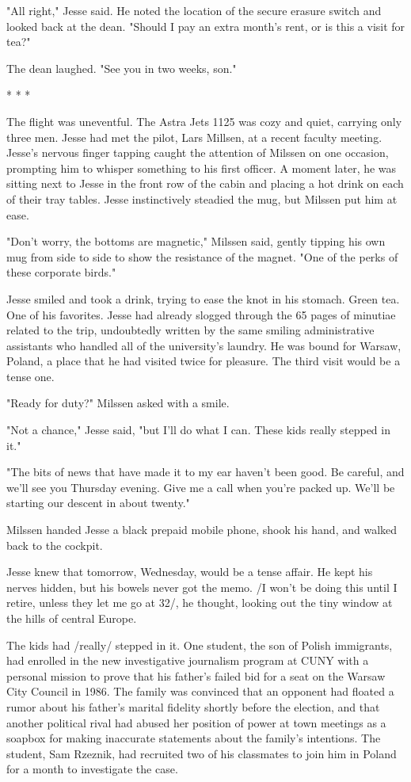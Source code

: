 "All right," Jesse said.  He noted the location of the secure erasure switch and looked back at the dean.  "Should I pay an extra month's rent, or is this a visit for tea?"

The dean laughed.  "See you in two weeks, son."

					* * *

The flight was uneventful.  The Astra Jets 1125 was cozy and quiet, carrying only three men.  Jesse had met the pilot, Lars Millsen, at a recent faculty meeting.  Jesse's nervous finger tapping caught the attention of Milssen on one occasion, prompting him to whisper something to his first officer.  A moment later, he was sitting next to Jesse in the front row of the cabin and placing a hot drink on each of their tray tables.  Jesse instinctively steadied the mug, but Milssen put him at ease.

"Don't worry, the bottoms are magnetic," Milssen said, gently tipping his own mug from side to side to show the resistance of the magnet.  "One of the perks of these corporate birds."

Jesse smiled and took a drink, trying to ease the knot in his stomach.  Green tea.  One of his favorites.  Jesse had already slogged through the 65 pages of minutiae related to the trip, undoubtedly written by the same smiling administrative assistants who handled all of the university's laundry.  He was bound for Warsaw, Poland, a place that he had visited twice for pleasure.  The third visit would be a tense one.

"Ready for duty?" Milssen asked with a smile.

"Not a chance," Jesse said, "but I'll do what I can.  These kids really stepped in it."

"The bits of news that have made it to my ear haven't been good.  Be careful, and we'll see you Thursday evening.  Give me a call when you're packed up.  We'll be starting our descent in about twenty."

Milssen handed Jesse a black prepaid mobile phone, shook his hand, and walked back to the cockpit.

Jesse knew that tomorrow, Wednesday, would be a tense affair.  He kept his nerves hidden, but his bowels never got the memo.  /I won't be doing this until I retire, unless they let me go at 32/, he thought, looking out the tiny window at the hills of central Europe.

The kids had /really/ stepped in it.  One student, the son of Polish immigrants, had enrolled in the new investigative journalism program at CUNY with a personal mission to prove that his father's failed bid for a seat on the Warsaw City Council in 1986.  The family was convinced that an opponent had floated a rumor about his father's marital fidelity shortly before the election, and that another political rival had abused her position of power at town meetings as a soapbox for making inaccurate statements about the family's intentions.  The student, Sam Rzeznik, had recruited two of his classmates to join him in Poland for a month to investigate the case.

